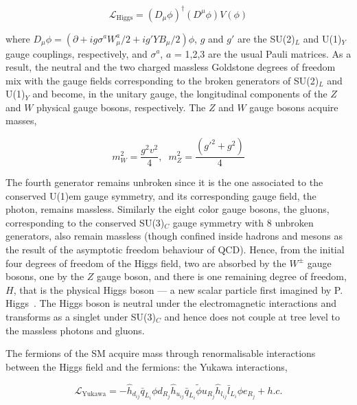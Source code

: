 \documentclass[12pt]{article}
\begin{document}
\begin{equation}
    \mathcal{L}_\text{Higgs} = (D_\mu\phi)^\dagger(D^\mu\phi) V(\phi)
\end{equation}

where $D_\mu\phi=(\partial + ig\sigma^aW^a_\mu/2 + ig'YB_\mu/2)\phi$, $g$ and $g'$ are the SU(2)$_L$ and U(1)$_Y$ gauge couplings, respectively, and $\sigma^a$, $a$ = 1,2,3 are the usual Pauli matrices. As a result, the neutral and the two charged massless Goldstone degrees of freedom mix with the gauge fields corresponding to the broken generators of SU(2)$_L$ and U(1)$_Y$ and become, in the unitary gauge, the longitudinal components of the $Z$ and $W$ physical gauge bosons, respectively. The $Z$ and $W$ gauge bosons acquire masses,

\begin{equation}
    m_W^2 = \frac{g^2v^2}{4}, \hspace{7pt} m_Z^2 = \frac{(g'^2+g^2)}{4}
\end{equation}

The fourth generator remains unbroken since it is the one associated to the conserved U(1)$\text{em}$ gauge symmetry, and its corresponding gauge field, the photon, remains massless. Similarly the eight color gauge bosons, the gluons, corresponding to the conserved SU(3)$_C$ gauge symmetry with 8 unbroken generators, also remain massless (though confined inside hadrons and mesons as the result of the asymptotic freedom behaviour of QCD). Hence, from the initial four degrees of freedom of the Higgs field, two are absorbed by the $W^\pm$ gauge bosons, one by the $Z$ gauge boson, and there is one remaining degree of freedom, $H$, that is the physical Higgs boson — a new scalar particle first imagined by P. Higgs~\cite{PhysRevLett.13.321,PhysRev.145.1156}. The Higgs boson is neutral under the electromagnetic interactions and transforms as a singlet under SU(3)$_C$ and hence does not couple at tree level to the massless photons and gluons.

The fermions of the SM acquire mass through renormalisable interactions between the Higgs field and the fermions: the Yukawa interactions,

\begin{equation}
    \mathcal{L}_\text{Yukawa} = -\hat{h}_{d_{ij}} \bar{q}_{L_i}\phi d_{R_j} \hat{h}_{u_{ij}} \bar{q}_{L_i}\tilde{\phi} u_{R_j} \hat{h}_{l_{ij}} \bar{l}_{L_i}\phi e_{R_j} + h.c.
\end{equation}
\end{document}
